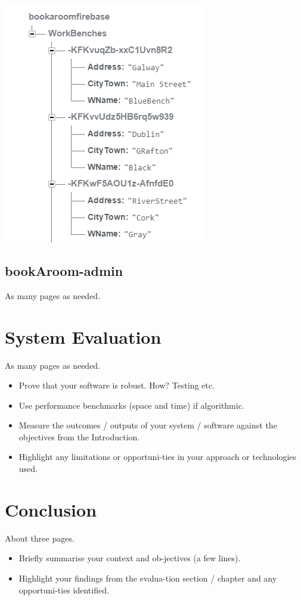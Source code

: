 \begin{center}    
	\includegraphics{img/Firebase.png}
\end{center}
\pagebreak





\section{bookAroom-admin}
As many pages as needed.


\chapter{System Evaluation}
As many pages as needed.
\begin{itemize}
\item Prove that your software is robust. How? Testing etc. 
\item Use performance benchmarks (space and time) if algorithmic.
\item Measure the outcomes / outputs of your system / software against the objectives from the Introduction.
\item Highlight any limitations or opportuni-ties in your approach or technologies used.
\end{itemize}

\chapter{Conclusion}
About three pages.

\begin{itemize}
\item Briefly summarise your context and ob-jectives (a few lines).
\item Highlight your findings from the evalua-tion section / chapter and any opportuni-ties identified.
\end{itemize}

